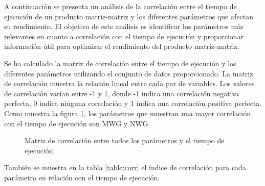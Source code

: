 A continuación se presenta un análisis de la correlación entre el tiempo de ejecución de un producto matriz-matriz y los diferentes parámetros que afectan su rendimiento. El objetivo de este análisis es identificar los parámetros más relevantes en cuanto a correlación con el tiempo de ejecución y proporcionar información útil para optimizar el rendimiento del producto matriz-matriz.

Se ha calculado la matriz de correlación entre el tiempo de ejecución y los diferentes parámetros utilizando el conjunto de datos proporcionado. La matriz de correlación muestra la relación lineal entre cada par de variables. Los valores de correlación varían entre -1 y 1, donde -1 indica una correlación negativa perfecta, 0 indica ninguna correlación y 1 indica una correlación positiva perfecta. Como muestra la figura \ref{figure:corr}, los parámetros que muestran una mayor correlación con el tiempo de ejecución son MWG y NWG.

\begin{figure}[h]
    \begin{center}
    \end{center}
    \caption{\label{figure:corr}Matriz de correlación entre todos los parámetros y el tiempo de ejecución.}
\end{figure}

También se muestra en la tabla \ref{table:corr} el índice de correlación para cada parámetro en relación con el tiempo de ejecución.

